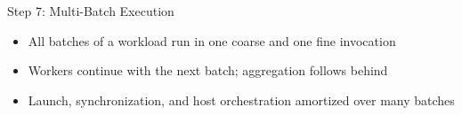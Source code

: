 \begin{frame}{Step 7: Multi-Batch Execution}
  \begin{itemize}\footnotesize
    \item All batches of a workload run in one coarse and one fine invocation
    \item Workers continue with the next batch; aggregation follows behind
    \item Launch, synchronization, and host orchestration amortized over many batches
  \end{itemize}
\end{frame}
